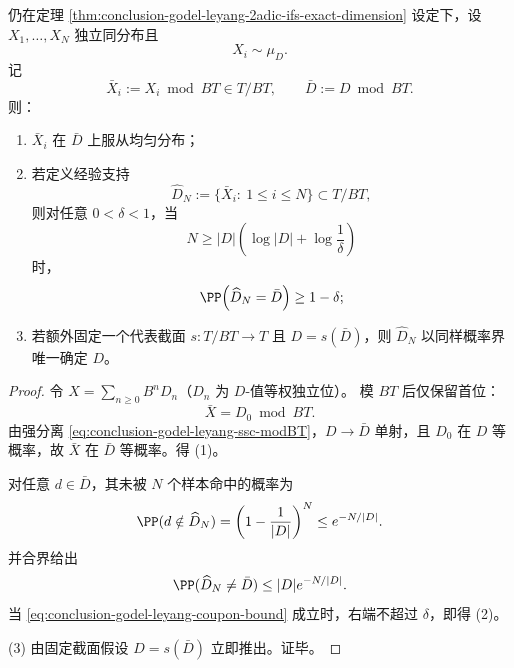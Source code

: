 \begin{theorem}[有限样本下数字扭点集的可识别恢复]\label{thm:conclusion-godel-leyang-finite-sample-identifiability}
仍在定理 \ref{thm:conclusion-godel-leyang-2adic-ifs-exact-dimension} 设定下，设 \(X_1,\dots,X_N\) 独立同分布且
\[
X_i\sim \mu_D.
\]
记
\[
\bar X_i:=X_i\bmod BT\in T/BT,\qquad
\bar D:=D\bmod BT.
\]
则：
\begin{enumerate}
  \item \(\bar X_i\) 在 \(\bar D\) 上服从均匀分布；
  \item 若定义经验支持
  \[
  \widehat D_N:=\{\bar X_i:\ 1\le i\le N\}\subset T/BT,
  \]
  则对任意 \(0<\delta<1\)，当
  \begin{equation}\label{eq:conclusion-godel-leyang-coupon-bound}
  N\ge |D|\!\left(\log|D|+\log\frac1\delta\right)
  \end{equation}
  时，
  \[
  \PP\!\left(\widehat D_N=\bar D\right)\ge 1-\delta;
  \]
  \item 若额外固定一个代表截面 \(s:T/BT\to T\) 且 \(D=s(\bar D)\)，则 \(\widehat D_N\) 以同样概率界唯一确定 \(D\)。
\end{enumerate}
\end{theorem}
\begin{proof}
令 \(X=\sum_{n\ge 0}B^nD_n\)（\(D_n\) 为 \(D\)-值等权独立位）。
模 \(BT\) 后仅保留首位：
\[
\bar X=D_0\bmod BT.
\]
由强分离 \eqref{eq:conclusion-godel-leyang-ssc-modBT}，\(D\to\bar D\) 单射，且 \(D_0\) 在 \(D\) 等概率，故 \(\bar X\) 在 \(\bar D\) 等概率。得 (1)。

对任意 \(d\in\bar D\)，其未被 \(N\) 个样本命中的概率为
\[
\PP(d\notin\widehat D_N)=\left(1-\frac1{|D|}\right)^N\le e^{-N/|D|}.
\]
并合界给出
\[
\PP(\widehat D_N\neq \bar D)
\le |D|e^{-N/|D|}.
\]
当 \eqref{eq:conclusion-godel-leyang-coupon-bound} 成立时，右端不超过 \(\delta\)，即得 (2)。

(3) 由固定截面假设 \(D=s(\bar D)\) 立即推出。证毕。
\end{proof}

